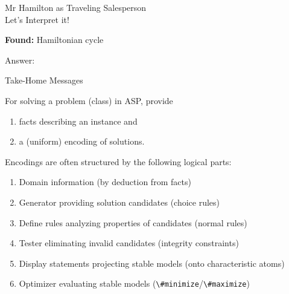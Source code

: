 \begin{frame}[fragile]{Mr Hamilton as Traveling Salesperson\\
              \normalsize Let's \alert{Interpret} it!}
\begin{block}{\textbf{Found:}  Hamiltonian cycle}
\begin{minipage}[t]{0.48\linewidth}
\begin{semiverbatim}
Answer: 
\end{semiverbatim}
\end{minipage}
\begin{minipage}[t]{0.45\linewidth}

\end{minipage}
\end{block}
\end{frame}
\begin{frame}{Take-Home Messages}

\bigskip{}
For solving a problem (class) in ASP, provide
\begin{enumerate}
\item<1-9,14> \alert{facts} describing an instance and
\item<1-8,14> a (uniform) \alert{encoding} of solutions.
\end{enumerate}

\bigskip{}
Encodings are often structured by the following logical parts:
\begin{enumerate}
\item<2-9,14> \alert{Domain} information \hfill (by deduction from facts)
\item<3-8,10,14> \alert{Generator} providing solution candidates \hfill (choice rules)
\item<4-8,10,14> \alert{Define} rules analyzing properties of candidates \hfill (normal rules)
\item<5-8,11,14> \alert{Tester} eliminating invalid candidates \hfill (integrity constraints)
\item<6-8,12,14> \alert{Display} statements projecting stable models \hfill (onto characteristic atoms)
\item<7-8,13,14> \alert{Optimizer} evaluating stable models \hfill (\lstinline{\#minimize}/\lstinline{\#maximize})
\end{enumerate}
\end{frame}
